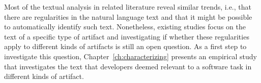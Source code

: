 Most of the textual analysis in related literature reveal similar trends, i.e., 
that there are regularities in the natural language text and that it might be possible 
to automatically identify such text. Nonetheless, 
existing studies focus on the text of a specific 
type of artifact and investigating if whether these regularities 
apply to different kinds of artifacts is still an open question. 
As a first step to investigate this question, 
Chapter~\ref{ch:characterizing}
presents an empirical study that investigates 
the text that developers 
deemed relevant to a software task 
in different kinds of artifact.


